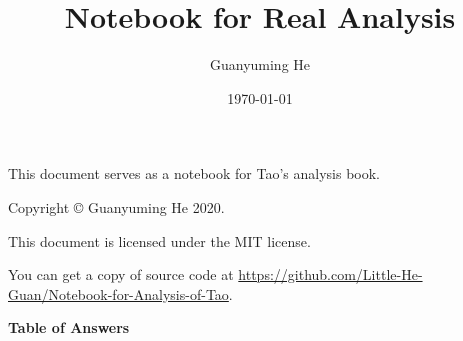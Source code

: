 \documentclass[11pt]{article}
\author{Guanyuming He}
\title{Notebook for Real Analysis}
\date{\today}
\begin{document}
\maketitle

\begin{center}
This document serves as a notebook for Tao's analysis book.
\end{center}

\vspace{\fill}

\begin{center}
Copyright \copyright{} Guanyuming He 2020. 

This document is licensed under the MIT license.

You can get a copy of source code at 
\url{https://github.com/Little-He-Guan/Notebook-for-Analysis-of-Tao}.
\end{center}

\newpage
{}
\tableofcontents

\newpage


\newpage
{}
\pagestyle{headings}



\newpage


\newpage


\newpage
\begin{center}
\begin{Large}
\textbf{Table of Answers}
\end{Large}
\end{center}
\end{document}
